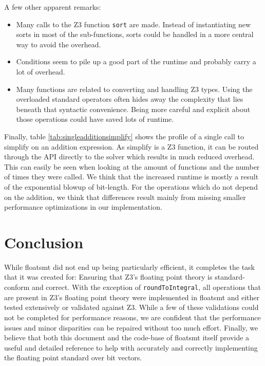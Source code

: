 \documentclass[a4paper,UKenglish,cleveref, autoref, thm-restate]{lipics-v2019}
\begin{document}
A few other apparent remarks:
\begin{itemize}
	\item Many calls to the Z3 function \verb|sort| are made. Instead of instantiating new sorts in most of the sub-functions, sorts could be handled in a more central way to avoid the overhead.
	\item Conditions seem to pile up a good part of the runtime and probably carry a lot of overhead.
	\item Many functions are related to converting and handling Z3 types. Using the overloaded standard operators often hides away the complexity that lies beneath that syntactic convenience. Being more careful and explicit about those operations could have saved lots of runtime.
\end{itemize}

Finally, table \ref{tab:singleadditionsimplify} shows the profile of a single call to simplify on an addition expression. As simplify is a Z3 function, it can be routed through the API directly to the solver which results in much reduced overhead. This can easily be seen when looking at the amount of functions and the number of times they were called. We think that the increased runtime is mostly a result of the exponential blowup of bit-length. For the operations which do not depend on the addition, we think that differences result mainly from missing smaller performance optimizations in our implementation.

\section{Conclusion}
While floatsmt did not end up being particularly efficient, it completes the task that it was created for: Ensuring that Z3's floating point theory is standard-conform and correct. With the exception of \verb|roundToIntegral|, all operations that are present in Z3's floating point theory were implemented in floatsmt and either tested extensively or validated against Z3. While a few of these validations could not be completed for performance reasons, we are confident that the performance issues and minor disparities can be repaired without too much effort. Finally, we believe that both this document and the code-base of floatsmt itself provide a useful and detailed reference to help with accurately and correctly implementing the floating point standard over bit vectors.



\appendix
\end{document}
